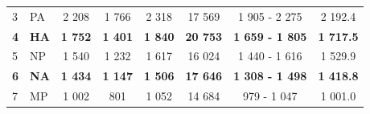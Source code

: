 \begin{table}[ht!]
\begin{tabular}{@{}llcccccc@{}}
	3                & PA                & \multicolumn{1}{c|}{2 208}                                                      & 1 766                                                                          & \multicolumn{1}{c|}{2 318}                                                      & 17 569                                                                        & 1 905 - 2 275                      & 2 192.4                                                                     \\
	\textbf{4}       & \textbf{HA}       & \multicolumn{1}{c|}{\textbf{1 752}}                                             & \textbf{1 401}                                                                 & \multicolumn{1}{c|}{\textbf{1 840}}                                             & \textbf{20 753}                                                               & \textbf{1 659 - 1 805}             & \textbf{1 717.5}                                                            \\
	5                & NP                & \multicolumn{1}{c|}{1 540}                                                      & 1 232                                                                          & \multicolumn{1}{c|}{1 617}                                                      & 16 024                                                                        & 1 440 - 1 616                      & 1 529.9                                                                     \\
	\textbf{6}       & \textbf{NA}       & \multicolumn{1}{c|}{\textbf{1 434}}                                             & \textbf{1 147}                                                                 & \multicolumn{1}{c|}{\textbf{1 506}}                                             & \textbf{17 646}                                                               & \textbf{1 308 - 1 498}             & \textbf{1 418.8}                                                            \\
	7                & MP                & \multicolumn{1}{c|}{1 002}                                                      & 801                                                                            & \multicolumn{1}{c|}{1 052}                                                      & 14 684                                                                        & 979 - 1 047                        & 1 001.0                                                                     \\

\end{tabular}
\end{table}
